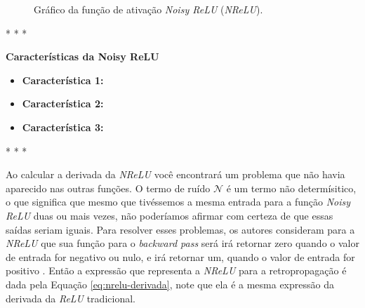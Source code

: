 \begin{figure}[h!]
    \centering
    \caption{Gráfico da função de ativação \textit{Noisy ReLU} (\textit{NReLU}).}
    \label{fig:nrelu}
\end{figure}

\medskip
\begin{center}
 * * *
\end{center}
\medskip

\textbf{Características da Noisy ReLU}
\vspace{1em}

\begin{itemize}
    \item \textbf{Característica 1:}
    \item \textbf{Característica 2:}
    \item \textbf{Característica 3:}
\end{itemize}

\medskip
\begin{center}
 * * *
\end{center}
\medskip

Ao calcular a derivada da \textit{NReLU} você encontrará um problema que não havia aparecido nas outras funções. O termo de ruído $\mathcal{N}$ é um termo não determísitico, o que significa que mesmo que tivéssemos a mesma entrada para a função \textit{Noisy ReLU} duas ou mais vezes, não poderíamos afirmar com certeza de que essas saídas seriam iguais. Para resolver esses problemas, os autores consideram para a \textit{NReLU} que sua função para o \textit{backward pass} será irá retornar zero quando o valor de entrada for negativo ou nulo, e irá retornar um, quando o valor de entrada for positivo \parencite{Nair2010}. Então a expressão que representa a \textit{NReLU} para a retropropagação é dada pela Equação \ref{eq:nrelu-derivada}, note que ela é a mesma expressão da derivada da \textit{ReLU} tradicional.

